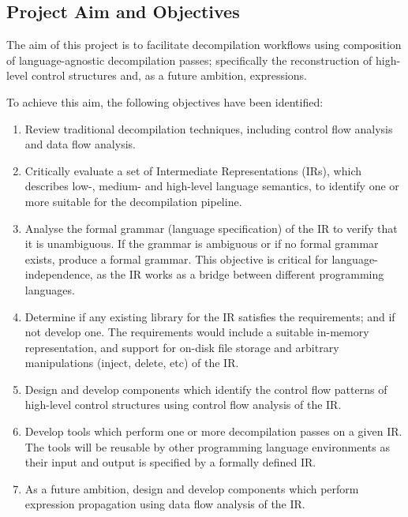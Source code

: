 
\subsection{Project Aim and Objectives}
\label{sec:project_aim_and_objectives}

The aim of this project is to facilitate decompilation workflows using composition of language-agnostic decompilation passes; specifically the reconstruction of high-level control structures and, as a future ambition, expressions.

To achieve this aim, the following objectives have been identified:
\begin{enumerate}
	\item Review traditional decompilation techniques, including control flow analysis and data flow analysis.
	\label{itm:obj_review_decomp_techniques}
	\item Critically evaluate a set of Intermediate Representations (IRs), which describes low-, medium- and high-level language semantics, to identify one or more suitable for the decompilation pipeline.
	\label{itm:obj_review_suitable_ir}
	\item Analyse the formal grammar (language specification) of the IR to verify that it is unambiguous. If the grammar is ambiguous or if no formal grammar exists, produce a formal grammar. This objective is critical for language-independence, as the IR works as a bridge between different programming languages.
	\label{itm:obj_formal_ir}
	\item Determine if any existing library for the IR satisfies the requirements; and if not develop one. The requirements would include a suitable in-memory representation, and support for on-disk file storage and arbitrary manipulations (inject, delete, etc) of the IR.
	\label{itm:obj_ir_library}
	\item Design and develop components which identify the control flow patterns of high-level control structures using control flow analysis of the IR.
	\label{itm:obj_control_flow_analysis_component}
	\item Develop tools which perform one or more decompilation passes on a given IR. The tools will be reusable by other programming language environments as their input and output is specified by a formally defined IR.
	\label{itm:obj_decomp_pass_tool}
	\item As a future ambition, design and develop components which perform expression propagation using data flow analysis of the IR.
	\label{itm:obj_data_analysis_library}
\end{enumerate}
